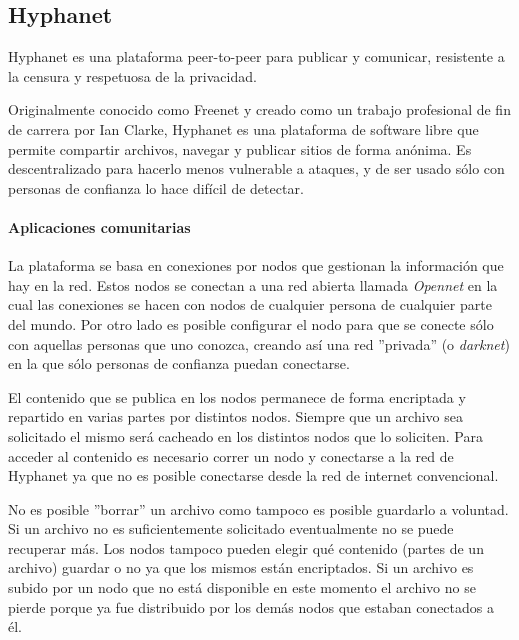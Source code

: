 \subsection{Hyphanet}

Hyphanet \cite{hyphanet-white-paper}\cite{hyphanet} es una plataforma peer-to-peer para publicar y comunicar, resistente a la censura y respetuosa de la privacidad.

Originalmente conocido como Freenet y creado como un trabajo profesional de fin de carrera por Ian Clarke, Hyphanet es una plataforma de software libre que permite compartir archivos, navegar y publicar sitios de forma anónima. Es descentralizado para hacerlo menos vulnerable a ataques, y de ser usado sólo con personas de confianza lo hace difícil de detectar.

\paragraph{Aplicaciones comunitarias}

La plataforma se basa en conexiones por nodos que gestionan la información que hay en la red. Estos nodos se conectan a una red abierta llamada \textit{Opennet} en la cual las conexiones se hacen con nodos de cualquier persona de cualquier parte del mundo. Por otro lado es posible configurar el nodo para que se conecte sólo con aquellas personas que uno conozca, creando así una red ''privada'' (o \textit{darknet}) en la que sólo personas de confianza puedan conectarse.

El contenido que se publica en los nodos permanece de forma encriptada y repartido en varias partes por distintos nodos. Siempre que un archivo sea solicitado el mismo será cacheado en los distintos nodos que lo soliciten. Para acceder al contenido es necesario correr un nodo y conectarse a la red de Hyphanet ya que no es posible conectarse desde la red de internet convencional.

No es posible ''borrar'' un archivo como tampoco es posible guardarlo a voluntad. Si un archivo no es suficientemente solicitado eventualmente no se puede recuperar más. Los nodos tampoco pueden elegir qué contenido (partes de un archivo) guardar o no ya que los mismos están encriptados. Si un archivo es subido por un nodo que no está disponible en este momento el archivo no se pierde porque ya fue distribuido por los demás nodos que estaban conectados a él.


